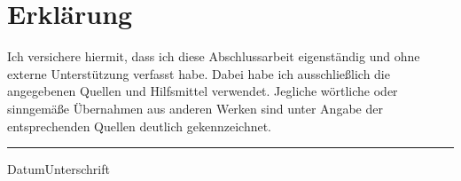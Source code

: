 \section*{Erklärung}
Ich versichere hiermit, dass ich diese Abschlussarbeit
eigenständig und ohne externe Unterstützung verfasst habe. 
Dabei habe ich ausschließlich die angegebenen Quellen und Hilfsmittel verwendet. 
Jegliche wörtliche oder sinngemäße Übernahmen aus anderen Werken sind unter Angabe der entsprechenden Quellen deutlich gekennzeichnet.
\vspace{10ex}\\

\hrule 
{\small{Datum}}\hfill{\small{Unterschrift}}
